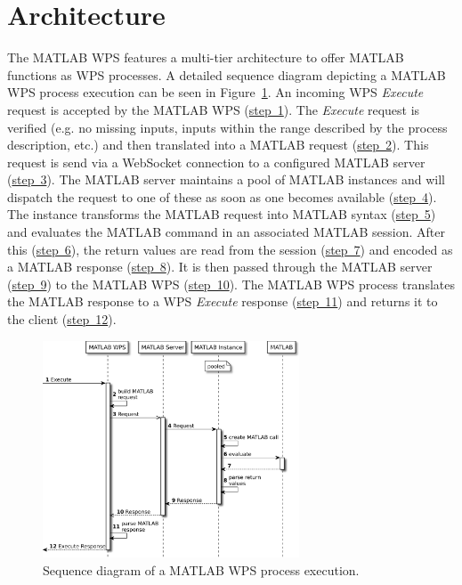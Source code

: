 	\section{Architecture}
		The MATLAB WPS features a multi-tier architecture to offer MATLAB functions as \acl{WPS} processes. A detailed sequence diagram depicting a MATLAB WPS process execution can be seen in Figure~\ref{fig:sd:mwps}. An incoming WPS \emph{Execute} request is accepted by the MATLAB WPS (\hyperref[fig:sd:mwps]{step~1}). The \emph{Execute} request is verified (e.g. no missing inputs, inputs within the range described by the process description, etc.) and then translated into a MATLAB request (\hyperref[fig:sd:mwps]{step~2}). This request is send via a WebSocket connection to a configured MATLAB server (\hyperref[fig:sd:mwps]{step~3}). The MATLAB server maintains a pool of MATLAB instances and will dispatch the request to one of these as soon as one becomes available (\hyperref[fig:sd:mwps]{step~4}). The instance transforms the MATLAB request into MATLAB syntax (\hyperref[fig:sd:mwps]{step~5}) and evaluates the MATLAB command in an associated MATLAB session. After this (\hyperref[fig:sd:mwps]{step~6}), the return values are read from the session (\hyperref[fig:sd:mwps]{step~7}) and encoded as a MATLAB response (\hyperref[fig:sd:mwps]{step~8}). It is then passed through the MATLAB server (\hyperref[fig:sd:mwps]{step~9}) to the MATLAB WPS (\hyperref[fig:sd:mwps]{step~10}). The MATLAB WPS process translates the MATLAB response to a WPS \emph{Execute} response (\hyperref[fig:sd:mwps]{step~11}) and returns it to the client (\hyperref[fig:sd:mwps]{step~12}).

		\begin{figure}[!htb]
			\centering
			\includegraphics[width=0.6788732394366197\textwidth]{figures/sequence-diagramm-mwps.pdf}
			\caption{\label{fig:sd:mwps}Sequence diagram of a MATLAB WPS process execution.}
		\end{figure}

